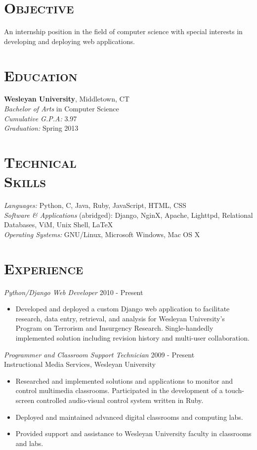 \documentclass[margin]{res}
\begin{document}
\begin{resume}
\section{\textsc{Objective}} An internship position in the field of computer science with special interests in developing and deploying web applications.

\section{\textsc{Education}} {\bf Wesleyan University}, Middletown, CT \\ {\sl Bachelor of Arts} in Computer Science \\
    {\sl Cumulative G.P.A:} 3.97 \\
    {\sl Graduation:} Spring 2013
 
 
\section{\textsc{Technical \\ Skills}}
    {\sl Languages:} Python, C, Java, Ruby, JavaScript, HTML, CSS \\
    {\sl Software \& Applications} (abridged): Django, NginX, Apache, Lighttpd, Relational Databases, ViM, Unix Shell, \LaTeX \\
    {\sl Operating Systems:} GNU/Linux, Microsoft Windows, Mac OS X

\section{\textsc{Experience}}
    {\sl Python/Django Web Developer} \hfill 2010 - Present
    \begin{itemize}  \itemsep -2pt %
        \item Developed and deployed a custom Django web application to facilitate research, data entry, retrieval, and analysis for Wesleyan University's Program on Terrorism and Insurgency Research. Single-handedly implemented solution including revision history and multi-user collaboration.
    \end{itemize}

    {\sl Programmer and Classroom Support Technician} \hfill 2009 - Present \\
    Instructional Media Services, Wesleyan University
    \begin{itemize}  \itemsep -2pt %
        \item Researched and implemented solutions and applications to monitor and control multimedia classrooms. Participated in the development of a touch-screen controlled audio-visual control system written in Ruby.
        \item Deployed and maintained advanced digital classrooms and computing labs.
        \item Provided support and assistance to Wesleyan University faculty in classrooms and labs.
    \end{itemize}


\end{resume}
\end{document}
